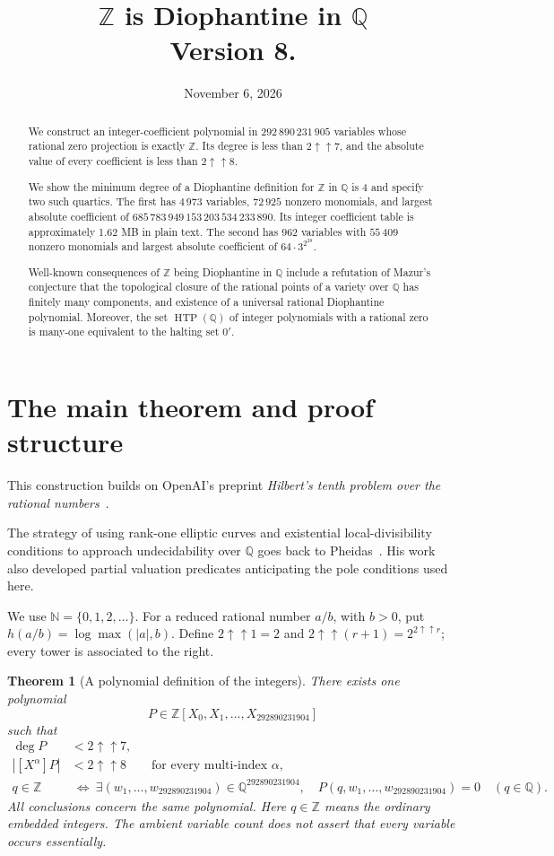 \documentclass[11pt]{article}
\title{$\mathbb{Z}$ is Diophantine in $\mathbb{Q}$\\[4pt]\large Version 8.}
\author{}
\date{November 6, 2026}
\newtheorem{theorem}{Theorem}[section]
\theoremstyle{definition}
\theoremstyle{remark}
\newcommand{\Q}{\mathbb Q}
\newcommand{\Z}{\mathbb Z}
\newcommand{\N}{\mathbb N}
\newcommand{\tw}[1]{2\mathbin{\uparrow\!\uparrow}#1}
\begin{document}
\maketitle
\begin{abstract}
We construct an integer-coefficient polynomial in
$292\,890\,231\,905$ variables whose rational zero projection is exactly
$\Z$. Its degree is less than $2\mathbin{\uparrow\!\uparrow}7$, and the
absolute value of every coefficient is less than
$2\mathbin{\uparrow\!\uparrow}8$.

We show the minimum degree of a Diophantine definition for $\Z$ in $\Q$ is 4 and specify two such quartics. The first has $4\,973$ variables, $72\,925$ nonzero monomials, and largest absolute coefficient of $685\,783\,949\,153\,203\,534\,233\,890$. Its integer coefficient table is approximately 1.62 MB in plain text. The second has $962$ variables with $55\,409$ nonzero monomials and largest absolute coefficient of $64\cdot 3^{2^{28}}$.

Well-known consequences of $\Z$ being Diophantine in $\Q$ include a refutation of Mazur's conjecture that the topological closure of the rational points of a variety over $\Q$ has finitely many components, and existence of a universal rational Diophantine polynomial. Moreover, the set $\operatorname{HTP}(\Q)$ of integer polynomials with a rational zero is many-one equivalent to the halting set $0'$.
\end{abstract}
\tableofcontents

\section{The main theorem and proof structure}\label{sec:main}
This construction builds on OpenAI's preprint
\emph{Hilbert's tenth problem over the rational numbers}~\cite{openaihtp}.

The strategy of using rank-one elliptic curves and existential
local-divisibility conditions to approach undecidability over $\Q$
goes back to Pheidas~\cite{pheidas2000}. His work also developed
partial valuation predicates anticipating the pole conditions used here.

We use $\N=\{0,1,2,\ldots\}$. For a reduced rational number $a/b$, with
$b>0$, put $h(a/b)=\log\max(|a|,b)$. Define $\tw1=2$ and
$\tw{(r+1)}=2^{\tw r}$; every tower is associated to the right.

\begin{theorem}[A polynomial definition of the integers]\label{thm:target}
There exists one polynomial
\[
 P\in\Z[X_0,X_1,\ldots,X_{292890231904}]
\]
such that
\begin{align*}
 \deg P&<\tw7,\\
 |[X^\alpha]P|&<\tw8\qquad\text{for every multi-index }\alpha,\\
 q\in\Z&\ \Longleftrightarrow\
 \exists(w_1,\ldots,w_{292890231904})\in\Q^{292890231904},\quad
 P(q,w_1,\ldots,w_{292890231904})=0\quad(q\in\Q).
\end{align*}
All conclusions concern the same polynomial. Here $q\in\Z$ means the
ordinary embedded integers. The ambient variable count does not assert that
every variable occurs essentially.
\end{theorem}
\end{document}
